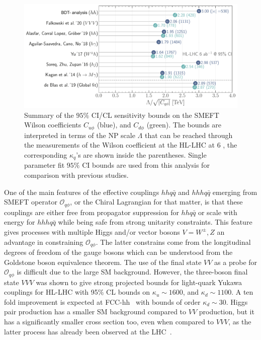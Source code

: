 \begin{figure}[t!]
	\includegraphics[width=\linewidth]{figures/ueberblick_ly.pdf}
	\caption{Summary of the $95\%$ CI/CL sensitivity bounds on the SMEFT Wilson coefficients $C_{u\phi}$ (blue), and $C_{d\phi}$ (green). The bounds are interpreted in terms of the NP scale $\Lambda$ that can be reached through the measurements of the Wilson coefficient at the HL-LHC at $6$ \invab, the corresponding $\kappa_q$'s are shown inside the parentheses. Single parameter fit $95\%$ CI bounds are used from this analysis for comparison with previous studies.}
	\label{fig:comparison}
\end{figure}

One of the main features of the effective couplings $hh q\bar q$ and $hhh q\bar q$ emerging from SMEFT operator $\mathcal O_{q\phi}$, or the Chiral Lagrangian for that matter, is that these couplings are either free from propagator suppression for $hh q\bar q$ or scale with energy for $hhh q\bar q$ while being safe from strong unitarity constraints. This feature gives processes with multiple Higgs and/or vector bosons $V= W^\pm, Z$ an advantage in constraining $\mathcal O_{q\phi}$. The latter constrains come from the longitudinal degrees of freedom of the gauge bosons  which can be understood from the Goldstone boson equivalence theorem. The use of the final state $VV$ as a probe for $\mathcal O_{q\phi}$ is difficult due to the large SM background. However, the three-boson final state $VVV$ was shown to give strong projected bounds for light-quark Yukawa couplings for HL-LHC with 95\% CL bounds on $\kappa_u \sim 1600$, and $\kappa_d\sim 1100$. A ten fold improvement is expected at FCC-hh~\cite{Falkowski:2020znk} with bounds of order $\kappa_d\sim 30$. 
Higgs pair production has a smaller SM background compared to $VV$ production, but it has a significantly smaller cross section too, even when compared to $VVV$, as the latter process has already been observed at the LHC~\cite{Sciandra:2688061,CMS-PAS-SMP-19-014}.

